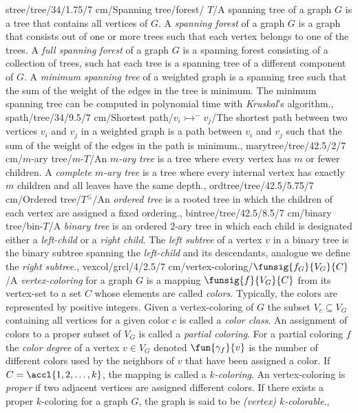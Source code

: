 stree/tree/34/1.75/7 cm/{Spanning tree/forest}/{\spanning{} $T$}/{A spanning tree of a graph $G$ is a tree that contains all vertices of $G$. A \emph{spanning forest} of a graph $G$ is a graph that consists out of one or more trees such that each vertex belongs to one of the trees. A \emph{full spanning forest} of a graph $G$ is a spanning forest consisting of a collection of trees, such hat each tree is a spanning tree of a different component of $G$. A \emph{minimum spanning tree} of a weighted graph is a spanning tree such that the sum of the weight of the edges in the tree is minimum. The minimum spanning tree can be computed in polynomial time with \emph{Kruskal}'s algorithm.},%
spath/tree/34/9.5/7 cm/{Shortest path}/{$v_i\rightarrowtail^{-} v_j$}/{The shortest path between two vertices $v_i$ and $v_j$ in a weighted graph is a path between $v_i$ and $v_j$ such that the sum of the weight of the edges in the path is minimum.},%
marytree/tree/42.5/2/7 cm/{$m$-ary tree}/{$m$-$T$}/{An \emph{$m$-ary tree} is a tree where every vertex has $m$ or fewer children. A \emph{complete $m$-ary tree} is a tree where every internal vertex has exactly $m$ children and all leaves have the same depth.},%
ordtree/tree/42.5/5.75/7 cm/{Ordered tree}/{$T^{\leq}$}/{An \emph{ordered tree} is a rooted tree in which the children of each vertex are assigned a fixed ordering.},%
bintree/tree/42.5/8.5/7 cm/{binary tree}/{bin-$T$}/{A \emph{binary tree} is an ordered $2$-ary tree in which each child is designated either a \emph{left-child} or a \emph{right child}. The \emph{left subtree} of a vertex $v$ in a binary tree is the binary
 subtree spanning the \emph{left-child} and its descendants, analogue we define the \emph{right subtree}.},%
vexcol/grcl/4/2.5/7 cm/{vertex-coloring}/{$\funsig{f_G}{V_G}{C}$}/{A \emph{vertex-coloring} for a graph $G$ is a mapping $\funsig{f}{V_G}{C}$ from its vertex-set to a set $C$ whose elements are called \emph{colors}. Typically, the colors are represented by positive integers. Given a vertex-coloring of $G$ the subset $V_c\subseteq V_G$ containing all vertices for a given color $c$ is called a \emph{color class}. An assignment of colors to a proper subset of $V_G$ is called a \emph{partial coloring}. For a partial coloring $f$ the \emph{color degree} of a vertex $v\in V_G$ denoted $\fun{\gamma_f}{v}$ is the number of different colors used by the neighbors of $v$ that have been assigned a color. If $C=\accl{1,2,\ldots,k}$, the mapping is called a \emph{$k$-coloring}. An vertex-coloring is \emph{proper} if two adjacent vertices are assigned different colors. If there exists a proper $k$-coloring for a graph $G$, the graph is said to be \emph{(vertex) $k$-colorable}.},
